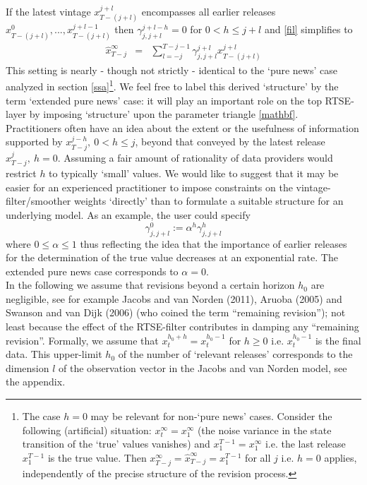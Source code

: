 \documentclass[11pt]{article}
\begin{document}
If the latest vintage $x_{T-(j+l)}^{j+l}$ encompasses all earlier releases $x_{T-(j+l)}^{0},...,x_{T-(j+l)}^{j+l-1}$ then $\gamma_{j,j+l}^{j+l-h}=0$ for $0< h\leq j+l$ and \ref{fil} simplifies to
\begin{eqnarray}
\hat{x}_{T-j}^\infty&=&\sum_{l=-j}^{T-j-1}\gamma_{j,j+l}^{j+l}x_{T-(j+l)}^{j+l}\label{purenews}
\end{eqnarray}
This setting is nearly - though not strictly - identical to the `pure news' case analyzed in section \ref{ssa}\footnote{The case $h=0$ may be relevant for non-`pure news' cases. Consider the following (artificial) situation: $x_t^\infty=x_1^\infty$ (the noise variance in the state transition of the `true' values vanishes) and $x_1^{T-1}=x_1^\infty$ i.e. the last release $x_1^{T-1}$ is the true value. Then $x_{T-j}^\infty=\hat{x}_{T-j}^\infty=x_1^{T-1}$ for all $j$ i.e. $h=0$ applies, independently of the precise structure of the revision process.}. We feel free to label this derived  `structure' by the term `extended pure news' case: it will play an important role on the top RTSE-layer by imposing `structure' upon the parameter triangle \ref{mathbf}. \\
Practitioners often have an idea about the extent or the usefulness of information supported by $x_{T-j}^{j-h}, ~0< h\leq j$, beyond that conveyed by the latest release $x_{T-j}^{j}, ~h=0$. Assuming a fair amount of rationality of data providers would restrict $h$ to typically `small' values. We would like to suggest that it may be easier for an experienced practitioner to impose constraints on the vintage-filter/smoother weights `directly' than to formulate a suitable structure for an underlying model. As an example, the user could specify 
\begin{equation}\label{gammah}
\gamma_{j,j+l}^{0}:=\alpha^h\gamma_{j,j+l}^{h}
\end{equation}
where $0\leq \alpha\leq 1$ thus reflecting the idea that the importance of earlier releases for the determination of the true value decreases at an exponential rate. The extended pure news case corresponds to $\alpha=0$.\\

In the following we assume that revisions beyond a certain horizon $h_0$ are negligible, see for example Jacobs and van Norden (2011), Aruoba (2005) and Swanson and van Dijk (2006) (who coined the term ``remaining revision''); not least because the effect of the RTSE-filter contributes in damping any ``remaining revision''. Formally, we assume that $x_t^{h_0+h}=x_t^{h_0-1}$ for $h\geq 0$ i.e. $x_t^{h_0-1}$ is the final data. This upper-limit $h_0$ of the number of `relevant releases' corresponds to the dimension $l$ of the observation vector in the Jacobs and van Norden model, see the appendix.
\end{document}
